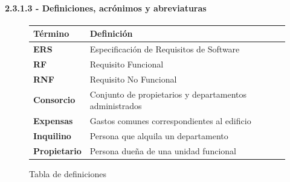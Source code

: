 \paragraph{2.3.1.3 - Definiciones, acrónimos y abreviaturas}

\begin{figure}[H]
    \centering
    \begin{tabular}{|l|p{10cm}|}
    \hline
            \textbf{Término} 
        
        & 
        
            \textbf{Definición} 
        
    \\ \hline
    
            \textbf{ERS} 
        
        & 
        
            Especificación de Requisitos de Software 
        
    \\ \hline
    
            \textbf{RF} 
        
        & 
        
            Requisito Funcional 
        
    \\ \hline
    
            \textbf{RNF} 
        
        & 
        
            Requisito No Funcional 
        
    \\ \hline
    
            \textbf{Consorcio} 
        
        & 
        
            Conjunto de propietarios y departamentos administrados 
        
    \\ \hline
    
            \textbf{Expensas} 
        
        & 
        
            Gastos comunes correspondientes al edificio 
        
    \\ \hline
    
            \textbf{Inquilino} 
        
        & 
        
            Persona que alquila un departamento 
        
    \\ \hline
    
            \textbf{Propietario} 
        
        & 
        
            Persona dueña de una unidad funcional 
        
    \\ \hline
    \end{tabular}
    \caption{Tabla de definiciones}
\end{figure}
